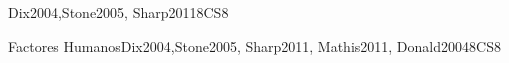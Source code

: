 \begin{syllabus}
\begin{competences}
    \item {} 
    \item {}
    \item {}
    \item {}
    \item {}
\end{competences}

\begin{unit}{\HCIFoundations}{}{Dix2004,Stone2005, Sharp2011}{8}{CS8}
\begin{topics}
    \item \HCIFoundationsTopicContexts
    \item \HCIFoundationsTopicUsability
    \item \HCIFoundationsTopicProcesses
    \item \HCIFoundationsTopicPrinciples
    \item \HCIFoundationsTopicDifferent
\end{topics}
\begin{learningoutcomes}
    \item \HCIFoundationsLODiscussWhy [\Familiarity]
    \item \HCIFoundationsLODefineA [\Familiarity]
    \item \HCIFoundationsLOSummarizeTheOf [\Familiarity]
      \item \HCIFoundationsLODevelop	[\Familiarity]
\end{learningoutcomes}
\end{unit}

\begin{unit}{Factores Humanos}{}{Dix2004,Stone2005, Sharp2011, Mathis2011, Donald2004}{8}{CS8}
\begin{topics}%
    \item \HCIFoundationsTopicCognitive
    \item \HCIFoundationsTopicPhysical
    \item \HCIFoundationsTopicAccessibility
    \item \HCIFoundationsTopicInterfaces
\end{topics}
\begin{learningoutcomes}
    \item \HCIFoundationsLOCreateAnd [\Familiarity]
\end{learningoutcomes}
\end{unit}


\end{syllabus}
